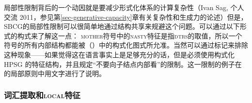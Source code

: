 局部性限制背后的一个动因就是要减少形式化体系的计算复杂性（Ivan Sag, 个人交流 2011，参见第\ref{sec-generative-capacity}章有关复杂性和生成力的论述）但是，SBCG的局部性限制可以很简单地通过结构共享来规避这个问题\citep[\S~9.6.1]{MuellerGTBuch2}。可以通过以下形式的构式来了解这一点：
\ea
{}
\z
\textsc{mother}符号中的\textsc{nasty}特征是指\textsc{dtrs}的取值，所以一个符号的所有内部结构都能被（）中的构式化图式所允准。当然可以通过标记来排除这种现象——如果觉得这在语言事实上是足够充分的话，但是必须使用构式化HPSG \citep{Sag97a}的特征结构，并且规定“不要向子结点内部看”的限制。这一限制的例子在 \citet[--144]{ps}的局部原则中用文字进行了说明。

\subsubsection{词汇提取和\textsc{local}特征}
\label{sec-sbcg-local-feature}

